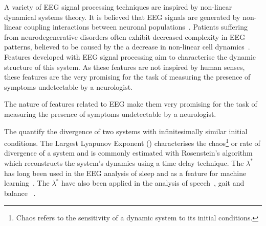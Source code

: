 \documentclass[12pt, twoside]{book}
\renewcommand\emph[1]{\textit{\color{USred}{#1}}}
\begin{document}
A variety of EEG signal processing techniques are inspired by non-linear dynamical systems theory. It is believed that EEG signals are generated by non-linear coupling interactions between neuronal populations~\cite{eegalzheimers}. Patients suffering from neurodegenerative disorders often exhibit decreased complexity in EEG patterns, believed to be caused by the a decrease in  non-linear cell dynamics~\cite{jelles1999decrease}. Features developed with EEG signal processing aim to characterise the dynamic structure of this system. As these features are not inspired by human senses, these features are the very promising for the task of measuring the presence of symptoms undetectable by a neurologist. 

\begin{highlight}
The nature of features related to EEG make them very promising for the task of measuring the presence of symptoms undetectable by a neurologist.
\end{highlight}


The \emph{Lyapunov Exponents} quantify the divergence of two systems with infinitesimally similar initial conditions. The Largest Lyapunov Exponent (\emph{$\lambda^*$}) characterises the chaos\footnote{Chaos refers to the sensitivity of a dynamic system to its initial conditions.} or rate of divergence of a system and is commonly estimated with Rosenstein's algorithm~\cite{rosenstein1993practicallyapunov} which reconstructs the system's dynamics using a time delay technique. The $\lambda^*$ has long been used in the EEG analysis of sleep and as a feature for machine learning~\cite{eeglyapunov1, eeglyapunov2}. The $\lambda^*$ have also been applied in the analysis of speech~\cite{banbrook1999speechlyapunov,kokkinos2005nonlinearlyapunov}, gait and balance ~\cite{dingwell2000nonlinearlyapunov, howcroft2014analysisgaitlyapunov, liu2015analysislyapunov}.
\end{document}
